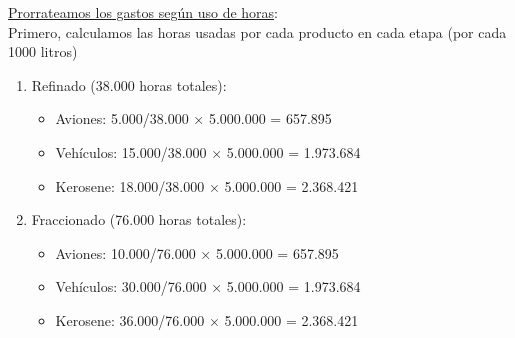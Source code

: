 \documentclass[10pt,a4paper]{article}
\begin{document}
\begin{enumerate}
\begin{itemize}
    \end{itemize}

    \underline{Prorrateamos los gastos según uso de horas}: \\

    Primero, calculamos las horas usadas por cada producto en cada etapa (por cada 1000 litros)

    \begin{center}
    \end{center}

    \vspace{0.5em}

    \begin{enumerate}[label=\alph*)]

        \item Refinado (38.000 horas totales):
        
        \begin{itemize}

            \item Aviones: 5.000/38.000 × 5.000.000 = 657.895
            \item Vehículos: 15.000/38.000 × 5.000.000 = 1.973.684
            \item Kerosene: 18.000/38.000 × 5.000.000 = 2.368.421 \\
    
        \end{itemize}

        \item Fraccionado (76.000 horas totales):
        
        \begin{itemize}

            \item Aviones: 10.000/76.000 × 5.000.000 = 657.895
            \item Vehículos: 30.000/76.000 × 5.000.000 = 1.973.684
            \item Kerosene: 36.000/76.000 × 5.000.000 = 2.368.421 \\
    

\end{itemize}
\end{enumerate}
\end{enumerate}
\end{document}
